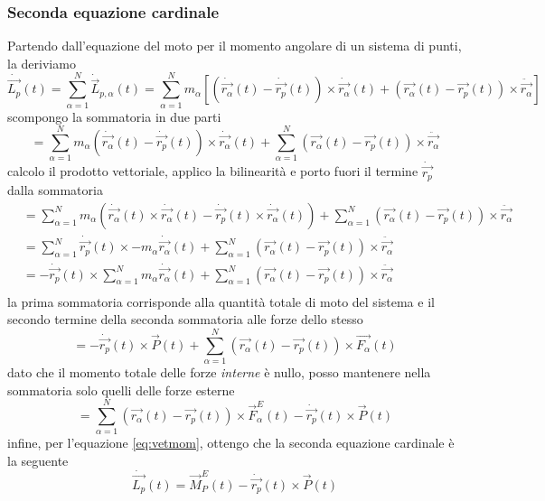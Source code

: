 \subsubsection{Seconda equazione cardinale}
Partendo dall'equazione del moto per il momento angolare di un sistema di punti, la deriviamo
\begin{equation*}
	\dot{\vec{L_p}}(t) = \sum_{\alpha=1}^N \dot{\vec{L}}_{p, \alpha}(t) = \sum_{\alpha=1}^N m_\alpha [(\dot{\vec{r_\alpha}}(t) - \dot{\vec{r_p}}(t)) \times \dot{\vec{r_\alpha}}(t) + (\vec{r_\alpha}(t) - \vec{r_p}(t)) \times \ddot{\vec{r_\alpha}}]
\end{equation*}
scompongo la sommatoria in due parti
\begin{equation*}
	= \sum_{\alpha=1}^N m_\alpha (\dot{\vec{r_\alpha}}(t) - \dot{\vec{r_p}}(t)) \times \dot{\vec{r_\alpha}}(t) +\sum_{\alpha=1}^N  (\vec{r_\alpha}(t) - \vec{r_p}(t)) \times \ddot{\vec{r_\alpha}}
\end{equation*}
calcolo il prodotto vettoriale, applico la bilinearità e porto fuori il termine $\dot{\vec{r_p}}$ dalla sommatoria
\begin{align*}
	& = \sum_{\alpha=1}^N m_\alpha (\dot{\vec{r_\alpha}}(t) \times \dot{\vec{r_\alpha}}(t) - \dot{\vec{r_p}}(t) \times \dot{\vec{r_\alpha}}(t))  +\sum_{\alpha=1}^N  (\vec{r_\alpha}(t) - \vec{r_p}(t)) \times \ddot{\vec{r_\alpha}} \\
	& = \sum_{\alpha=1}^N \dot{\vec{r_p}}(t) \times -m_\alpha\dot{\vec{r_\alpha}}(t)  +\sum_{\alpha=1}^N  (\vec{r_\alpha}(t) - \vec{r_p}(t)) \times \ddot{\vec{r_\alpha}} \\
	& = -\dot{\vec{r_p}}(t) \times \sum_{\alpha=1}^N m_\alpha\dot{\vec{r_\alpha}}(t)  +\sum_{\alpha=1}^N  (\vec{r_\alpha}(t) - \vec{r_p}(t)) \times \ddot{\vec{r_\alpha}} \\
\end{align*}
la prima sommatoria corrisponde alla quantità totale di moto del sistema e il secondo termine della seconda sommatoria alle forze dello stesso
\begin{equation*}
	= - \dot{\vec{r_p}}(t) \times \vec{P}(t)  +\sum_{\alpha=1}^N  (\vec{r_\alpha}(t) - \vec{r_p}(t)) \times \vec{F_\alpha}(t)
\end{equation*}
dato che il momento totale delle forze \textit{interne} è nullo, posso mantenere nella sommatoria solo quelli delle forze esterne
\begin{equation*}
	= \sum_{\alpha=1}^N  (\vec{r_\alpha}(t) - \vec{r_p}(t)) \times \vec{F}_\alpha^E(t) - \dot{\vec{r_p}}(t) \times \vec{P}(t)
\end{equation*}
infine, per l'equazione \ref{eq:vetmom}, ottengo che la seconda equazione cardinale è la seguente
\begin{equation}
	\dot{\vec{L_p}}(t) = \vec{M}_P^E(t) - \dot{\vec{r_p}}(t) \times \vec{P}(t)
\end{equation}

